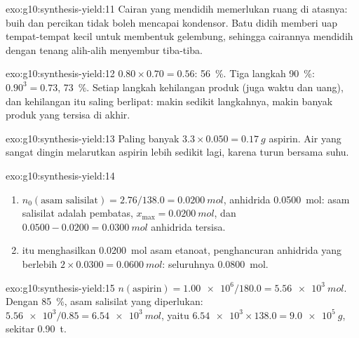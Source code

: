 \begin{solution}{exo:g10:synthesis-yield:11}
Cairan yang mendidih memerlukan ruang di atasnya: buih dan percikan
tidak boleh mencapai kondensor. Batu didih memberi uap tempat-tempat
kecil untuk membentuk gelembung, sehingga cairannya mendidih dengan
tenang alih-alih menyembur tiba-tiba.
\end{solution}

\begin{solution}{exo:g10:synthesis-yield:12}
$0.80 \times 0.70 = 0.56$: \qty{56}{\percent}. Tiga langkah
\qty{90}{\percent}: $0.90^3 = 0.73$, \qty{73}{\percent}. Setiap langkah
kehilangan produk (juga waktu dan uang), dan kehilangan itu saling
berlipat: makin sedikit langkahnya, makin banyak produk yang tersisa di
akhir.
\end{solution}

\begin{solution}{exo:g10:synthesis-yield:13}
Paling banyak $3.3 \times 0.050 = \qty{0.17}{g}$ aspirin. Air yang
sangat dingin melarutkan aspirin lebih sedikit lagi, karena
 turun bersama suhu.
\end{solution}

\begin{solution}{exo:g10:synthesis-yield:14}
\begin{enumerate}
  \item $n_0(\text{asam salisilat}) = 2.76 / 138.0 = \qty{0.0200}{mol}$,
        anhidrida \qty{0.0500}{mol}: asam salisilat adalah pembatas,
        $x_{\max} = \qty{0.0200}{mol}$, dan $0.0500 - 0.0200 =
        \qty{0.0300}{mol}$ anhidrida tersisa.
  \item {} itu menghasilkan \qty{0.0200}{mol} asam etanoat,
        penghancuran anhidrida yang berlebih
        $2 \times 0.0300 = \qty{0.0600}{mol}$: seluruhnya
        \qty{0.0800}{mol}.
\end{enumerate}
\end{solution}

\begin{solution}{exo:g10:synthesis-yield:15}
$n(\text{aspirin}) = \num{1.00e6} / 180.0 = \qty{5.56e3}{mol}$. Dengan
 \qty{85}{\percent}, asam salisilat yang diperlukan:
$\num{5.56e3} / 0.85 = \qty{6.54e3}{mol}$, yaitu
$\num{6.54e3} \times 138.0 = \qty{9.0e5}{g}$, sekitar \qty{0.90}{t}.
\end{solution}

